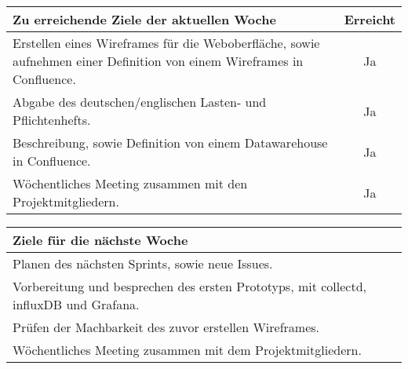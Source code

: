 \begin{tabularx}{\textwidth}{Xc}
    \arrayrulecolor{OliveGreen}
    \toprule
    {\bfseries Zu erreichende Ziele der aktuellen Woche} & {\bfseries Erreicht} \\
    \midrule[2pt]
    Erstellen eines Wireframes für die Weboberfläche, sowie aufnehmen einer
    Definition von einem Wireframes in Confluence.  &Ja               \\
    \rowcolor{OliveGreen!15}
    Abgabe des deutschen/englischen Lasten- und Pflichtenhefts.  &Ja          \\
    \rowcolor{White}
    Beschreibung, sowie Definition von einem Datawarehouse in Confluence. &Ja \\
    \rowcolor{OliveGreen!15}
    Wöchentliches Meeting zusammen mit den Projektmitgliedern.  &Ja           \\
   \bottomrule[2pt]
\end{tabularx}
%
\vspace{1cm}
%
\begin{tabularx}{\textwidth}{Xc}
    \arrayrulecolor{OliveGreen}
    \toprule
    {\bfseries Ziele für die nächste Woche}              &                   \\
    \midrule[2pt]
    Planen des nächsten Sprints, sowie neue Issues.       &                   \\
    \rowcolor{OliveGreen!15}
    Vorbereitung und besprechen des ersten Prototyps, mit collectd, influxDB
    und Grafana.            &                   \\
    \rowcolor{White}
    Prüfen der Machbarkeit des zuvor erstellen Wireframes. &                  \\
    \rowcolor{OliveGreen!15}
    Wöchentliches Meeting zusammen mit dem Projektmitgliedern. & \\
\end{tabularx}
